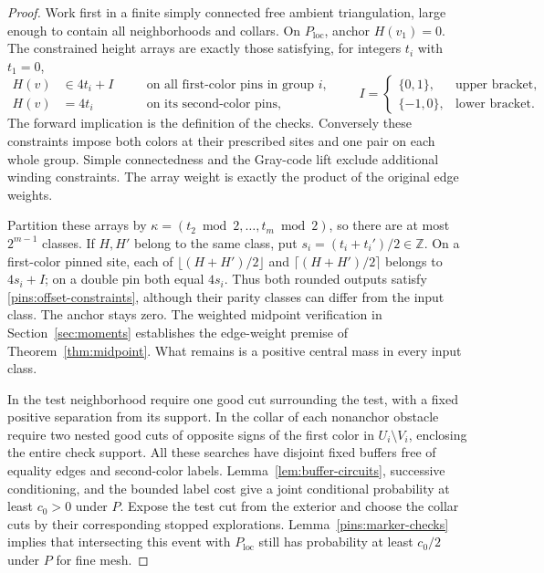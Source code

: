 \documentclass[11pt]{article}
\theoremstyle{definition}
\theoremstyle{remark}
\numberwithin{equation}{section}
\begin{document}
\begin{proof}
Work first in a finite simply connected free ambient triangulation,
large enough to contain all neighborhoods and collars.  On
$P_{\mathrm{loc}}$, anchor $H(v_1)=0$.  The constrained height arrays
are exactly those satisfying, for integers $t_i$ with $t_1=0$,
\begin{equation}\label{pins:offset-constraints}
 \begin{aligned}
 H(v)&\in4t_i+I\quad &&\text{on all first-color pins in group }i,\\
 H(v)&=4t_i&&\text{on its second-color pins},
 \end{aligned}
 \qquad
 I=\begin{cases}\{0,1\},&\text{upper bracket},\\
                  \{-1,0\},&\text{lower bracket}.
    \end{cases}
\end{equation}
The forward implication is the definition of the checks.  Conversely
these constraints impose both colors at their prescribed sites and one
pair on each whole group.  Simple connectedness and the Gray-code lift
exclude additional winding constraints.  The array weight is exactly
the product of the original edge weights.

Partition these arrays by
$\kappa=(t_2\bmod2,\ldots,t_m\bmod2)$, so there are at most
$2^{m-1}$ classes.  If $H,H'$ belong to the same class, put
$s_i=(t_i+t_i')/2\in\mathbb Z$.  On a first-color pinned site, each of
$\lfloor(H+H')/2\rfloor$ and $\lceil(H+H')/2\rceil$ belongs to
$4s_i+I$; on a double pin both equal $4s_i$.  Thus both rounded
outputs satisfy \eqref{pins:offset-constraints}, although their parity
classes can differ from the input class.  The anchor stays zero.
The weighted midpoint verification in Section~\ref{sec:moments}
establishes the edge-weight premise of Theorem~\ref{thm:midpoint}.  What
remains is a positive central mass in every input class.

In the test neighborhood require one good cut surrounding the test,
with a fixed positive separation from its support.  In the collar of
each nonanchor obstacle require two nested good cuts of opposite signs
of the first color in $U_i\setminus V_i$, enclosing the entire check support.
All these searches have disjoint fixed buffers free of
equality edges and second-color labels.  Lemma~\ref{lem:buffer-circuits},
successive conditioning, and the bounded label cost give a joint
conditional probability at least $c_0>0$ under $P$.  Expose the test
cut from the exterior and choose the collar cuts by their corresponding
stopped explorations.  Lemma~\ref{pins:marker-checks} implies that
intersecting this event with $P_{\mathrm{loc}}$ still has probability
at least $c_0/2$ under $P$ for fine mesh.


\end{proof}
\end{document}
